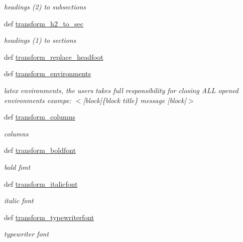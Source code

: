 \begin{DoxyCompactItemize}
\begin{DoxyCompactList}\small\item\em headings (2) to subsections \end{DoxyCompactList}\item 
def \hyperlink{namespaceuicilibris_1_1transform_acc6bfd3da7f1657fc0bbd55685a112b0}{transform\-\_\-h2\-\_\-to\-\_\-sec}
\begin{DoxyCompactList}\small\item\em headings (1) to sections \end{DoxyCompactList}\item 
def \hyperlink{namespaceuicilibris_1_1transform_af94a2eb2a5f807cbd5ee814fdd318d50}{transform\-\_\-replace\-\_\-headfoot}
\item 
def \hyperlink{namespaceuicilibris_1_1transform_a27e91c2f8fb8ba1f34dce7f6111a3b4c}{transform\-\_\-environments}
\begin{DoxyCompactList}\small\item\em latex environments, the users takes full responsibility for closing \-A\-L\-L opened environments exampe\-: $<$\mbox{[}block\mbox{]}\{block title\} message \mbox{[}block\mbox{]}$>$ \end{DoxyCompactList}\item 
def \hyperlink{namespaceuicilibris_1_1transform_a4e36567d6f7659c10d179fec4092398a}{transform\-\_\-columns}
\begin{DoxyCompactList}\small\item\em columns \end{DoxyCompactList}\item 
def \hyperlink{namespaceuicilibris_1_1transform_ad3c2902376497c6e1504dfcb830eac9a}{transform\-\_\-boldfont}
\begin{DoxyCompactList}\small\item\em bold font \end{DoxyCompactList}\item 
def \hyperlink{namespaceuicilibris_1_1transform_a40ff5313cc423d40d9d412d7dcbecf75}{transform\-\_\-italicfont}
\begin{DoxyCompactList}\small\item\em italic font \end{DoxyCompactList}\item 
def \hyperlink{namespaceuicilibris_1_1transform_a6d96b97868833f6e38d5f9daf31e8f33}{transform\-\_\-typewriterfont}
\begin{DoxyCompactList}\small\item\em typewriter font \end{DoxyCompactList}\item 

\end{DoxyCompactItemize}
